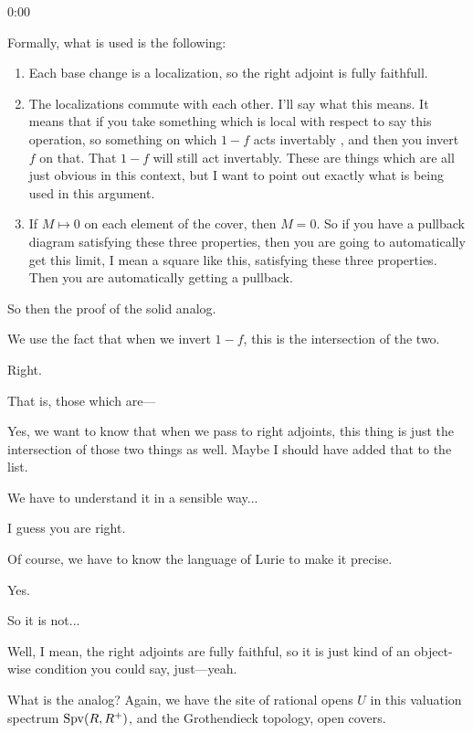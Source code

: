 \begin{unfinished}{0:00}
\begin{remark}
Formally, what is used is the following:
\begin{enumerate}
\item Each base change is a localization, so the right adjoint is fully faithfull.
\item The localizations commute with each other.  I'll say what this means. It means that if you take something which is local with respect to say this operation, so something on which $1-f$ acts invertably , and then you invert $f$ on that. That $1-f$ will still act invertably. These are things which are all just obvious in this context, but I want to point out exactly what is being used in this argument.
\item If $M \mapsto 0$ on each element of the cover, then $M = 0$. 
So if you have a pullback diagram satisfying these three properties, then you are going to automatically get this limit, I mean a square like this, satisfying these three properties. Then you are automatically getting a pullback.
\end{enumerate}
\end{remark}

So then the proof of the solid analog. 

\gabber We use the fact that when we invert $1-f$, this is the intersection of the two. 

\answer Right.

\gabber That is, those which are---

\answer Yes, we want to know that when we pass to right adjoints, this thing  is just the intersection of those two things as well. Maybe I should have added that to the list.

\gabber We have to understand it in a sensible way... 

\answer I guess you are right. 

\gabber Of course, we have to know the language of Lurie to make it precise. 

\answer Yes.

\gabber So it is not...

\answer Well, I mean, the right adjoints are fully faithful, so it is just kind of an object-wise condition you could say, just---yeah.

What is the analog? Again, we have the site of rational opens $U$ in this valuation spectrum $\operatorname{Spv}(R, R^+)$, and the Grothendieck topology, open covers.


\end{unfinished}
